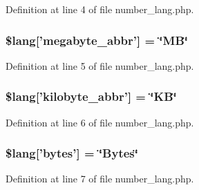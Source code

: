 Definition at line 4 of file number\-\_\-lang.\-php.

\hypertarget{number__lang_8php_ae1fdf8fb2977ddec5fd9f2237f277edc}{
\subsubsection[{\$lang}]{\setlength{\rightskip}{0pt plus 5cm}\$lang\mbox{[}'megabyte\-\_\-abbr'\mbox{]} = \char`\"{}M\-B\char`\"{}}}\label{number__lang_8php_ae1fdf8fb2977ddec5fd9f2237f277edc}


Definition at line 5 of file number\-\_\-lang.\-php.

\hypertarget{number__lang_8php_a78200289bbf44dce8b0d5f06072379e6}{
\subsubsection[{\$lang}]{\setlength{\rightskip}{0pt plus 5cm}\$lang\mbox{[}'kilobyte\-\_\-abbr'\mbox{]} = \char`\"{}K\-B\char`\"{}}}\label{number__lang_8php_a78200289bbf44dce8b0d5f06072379e6}


Definition at line 6 of file number\-\_\-lang.\-php.

\hypertarget{number__lang_8php_aeec8ade1229052ff8627a350480bba9c}{
\subsubsection[{\$lang}]{\setlength{\rightskip}{0pt plus 5cm}\$lang\mbox{[}'bytes'\mbox{]} = \char`\"{}Bytes\char`\"{}}}\label{number__lang_8php_aeec8ade1229052ff8627a350480bba9c}


Definition at line 7 of file number\-\_\-lang.\-php.

